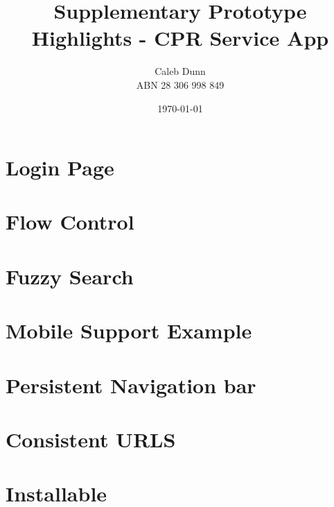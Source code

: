 \documentclass[11pt]{article}
\title{Supplementary Prototype Highlights - CPR Service App}
\author{ Caleb Dunn \\ ABN 28 306 998 849}
\date{\today}
\begin{document}
    \maketitle
    \pagebreak
    \tableofcontents

    \pagebreak
    \section{Login Page}\label{sec:login-page}

    \pagebreak
    \section{Flow Control}\label{sec:flow-control}

    \pagebreak
    \section{Fuzzy Search}\label{sec:fuzzy-search}

    \pagebreak
    \section{Mobile Support Example}\label{sec:mobile-first-example}

    \pagebreak
    \section{Persistent Navigation bar}\label{sec:persistent-navigation-bar}

    \pagebreak
    \section{Consistent URLS}\label{sec:consistent-urls}

    \pagebreak
    \section{Installable}
\end{document}
